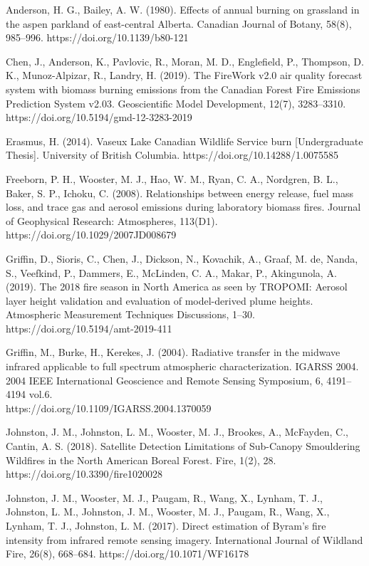 \begin{mybibliography}

Anderson, H. G., Bailey, A. W. (1980). Effects of annual burning on grassland in the aspen parkland of east-central Alberta. Canadian Journal of Botany, 58(8), 985–996. https://doi.org/10.1139/b80-121

Chen, J., Anderson, K., Pavlovic, R., Moran, M. D., Englefield, P., Thompson, D. K., Munoz-Alpizar, R., Landry, H. (2019). The FireWork v2.0 air quality forecast system with biomass burning emissions from the Canadian Forest Fire Emissions Prediction System v2.03. Geoscientific Model Development, 12(7), 3283–3310. \\https://doi.org/10.5194/gmd-12-3283-2019

Erasmus, H. (2014). Vaseux Lake Canadian Wildlife Service burn [Undergraduate Thesis]. University of British Columbia. https://doi.org/10.14288/1.0075585

Freeborn, P. H., Wooster, M. J., Hao, W. M., Ryan, C. A., Nordgren, B. L., Baker, S. P., Ichoku, C. (2008). Relationships between energy release, fuel mass loss, and trace gas and aerosol emissions during laboratory biomass fires. Journal of Geophysical Research: Atmospheres, 113(D1). https://doi.org/10.1029/2007JD008679

Griffin, D., Sioris, C., Chen, J., Dickson, N., Kovachik, A., Graaf, M. de, Nanda, S., Veefkind, P., Dammers, E., McLinden, C. A., Makar, P., Akingunola, A. (2019). The 2018 fire season in North America as seen by TROPOMI: Aerosol layer height validation and evaluation of model-derived plume heights. Atmospheric Measurement Techniques Discussions, 1–30. https://doi.org/10.5194/amt-2019-411

Griffin, M., Burke, H., Kerekes, J. (2004). Radiative transfer in the midwave infrared applicable to full spectrum atmospheric characterization. IGARSS 2004. 2004 IEEE International Geoscience and Remote Sensing Symposium, 6, 4191–4194 vol.6. \\https://doi.org/10.1109/IGARSS.2004.1370059

Johnston, J. M., Johnston, L. M., Wooster, M. J., Brookes, A., McFayden, C., Cantin, A. S. (2018). Satellite Detection Limitations of Sub-Canopy Smouldering Wildfires in the North American Boreal Forest. Fire, 1(2), 28. https://doi.org/10.3390/fire1020028

Johnston, J. M., Wooster, M. J., Paugam, R., Wang, X., Lynham, T. J., Johnston, L. M., Johnston, J. M., Wooster, M. J., Paugam, R., Wang, X., Lynham, T. J., Johnston, L. M. (2017). Direct estimation of Byram’s fire intensity from infrared remote sensing imagery. International Journal of Wildland Fire, 26(8), 668–684. https://doi.org/10.1071/WF16178


\end{mybibliography}
